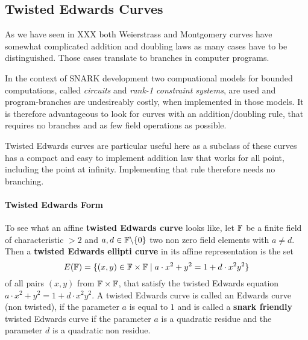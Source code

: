 
\subsection{Twisted Edwards Curves}
As we have seen in XXX both Weierstrass and Montgomery curves have somewhat complicated addition and doubling laws as many cases have to be distinguished. Those cases translate to branches in computer programs.

In the context of SNARK development two compuational models for bounded computations, called \textit{circuits} and \textit{rank-1 constraint systems}, are used and program-branches are undesireably costly, when implemented in those models. It is therefore advantageous to look for curves with an addition/doubling rule, that requires no branches and as few field operations as possible.

Twisted Edwards curves are particular useful here as a subclass of these curves has a compact and easy to implement addition law that works for all point, including the point at infinity. Implementing that rule therefore needs no branching.
\paragraph{Twisted Edwards Form}
To see what an affine \textbf{twisted Edwards curve} looks like, let $\mathbb{F}$ be a finite field of characteristic $>2$ and $a,d\in \mathbb{F}\backslash\{0\}$ two non zero field elements with $a\neq d$. Then a \textbf{twisted Edwards ellipti curve} in its affine representation is the set
\begin{equation}
E(\mathbb{F})=\{(x,y)\in\mathbb{F}\times\mathbb{F}\;|\; a\cdot x^2+y^2= 1+d\cdot x^2y^2\}
\end{equation}
of all pairs $(x,y)$ from $\mathbb{F}\times \mathbb{F}$, that satisfy the twisted Edwards equation $a\cdot x^2+y^2= 1+d\cdot x^2y^2$. A twisted Edwards curve is called an Edwards curve (non twisted), if the parameter $a$ is equal to $1$ and is called a \textbf{snark friendly} twisted Edwards curve if the parameter $a$ is a quadratic residue and the parameter $d$ is a quadratic non residue.

